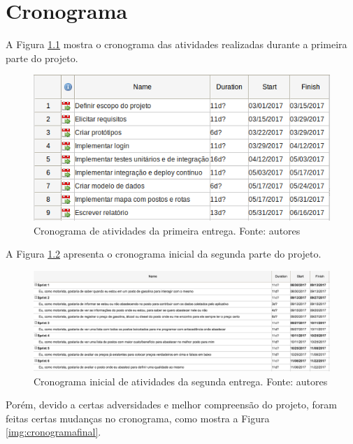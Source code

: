 \chapter[Cronograma]{Cronograma}
\label{chap:crono}

A Figura \ref{img:cronograma} mostra o cronograma das atividades realizadas durante a primeira parte do projeto.

\begin{figure}[H]
    \centering
    \includegraphics[scale=0.5]{figuras/cronograma_r1.png}
    \caption[Cronograma de atividades da primeira entrega.]{Cronograma de atividades da primeira entrega. Fonte: autores}
    \label{img:cronograma}
\end{figure}

A Figura \ref{img:cronograma2inicial} apresenta o cronograma inicial da segunda parte do projeto.

\begin{figure}[H]
    \centering
    \includegraphics[scale=0.4]{figuras/cronograma_segunda_parte_1.png}
    \caption[Cronograma inicial de atividades da segunda entrega.]{Cronograma inicial de atividades da segunda entrega. Fonte: autores}
    \label{img:cronograma2inicial}
\end{figure}
\pagebreak

Porém, devido a certas adversidades e melhor compreensão do projeto, foram feitas certas mudanças no cronograma, como mostra a Figura \ref{img:cronogramafinal}.

